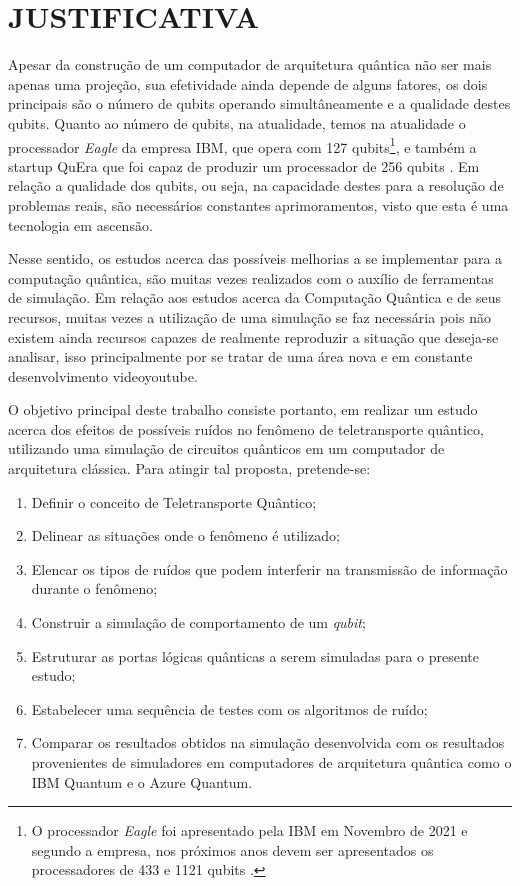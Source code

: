 \documentclass[12pt,oneside,brazil,hidelinks,article,sumario=tradicional,a4paper]{abntex2}
\begin{document}
\clearpage




\section{JUSTIFICATIVA}\label{sec:just}

Apesar da construção de um computador de arquitetura quântica não ser mais apenas uma projeção, sua efetividade ainda depende de alguns fatores, os dois principais são o número de qubits operando simultâneamente e a qualidade destes qubits.
Quanto ao número de qubits, na atualidade, temos na atualidade o processador \textit{Eagle} da empresa IBM, que opera com 127 qubits\footnote{O processador \textit{Eagle} foi apresentado pela IBM em Novembro de 2021 e segundo a empresa, nos próximos anos devem ser apresentados os processadores de 433 e 1121 qubits \cite{processadoribm}.}, e também a startup QuEra que foi capaz de produzir um processador de 256 qubits \cite{quera}. Em relação a qualidade dos qubits, ou seja, na capacidade destes para a resolução de problemas reais, são necessários constantes aprimoramentos, visto que esta é uma tecnologia em ascensão.

Nesse sentido, os estudos acerca das possíveis melhorias a se implementar para a computação quântica, são muitas vezes realizados com o auxílio de ferramentas de simulação. Em relação aos estudos acerca da Computação Quântica e de seus recursos, muitas vezes a utilização de uma simulação se faz necessária pois não existem ainda recursos capazes de realmente reproduzir a situação que deseja-se analisar, isso principalmente por se tratar de uma área nova e em constante desenvolvimento {videoyoutube}.

O objetivo principal deste trabalho consiste portanto, em realizar um estudo acerca dos efeitos de possíveis ruídos no fenômeno de teletransporte quântico, utilizando uma simulação de circuitos quânticos em um computador de arquitetura clássica. Para atingir tal proposta, pretende-se:
\begin{enumerate}
\item Definir o conceito de Teletransporte Quântico; \label{obj1}
\item Delinear as situações onde o fenômeno é utilizado; \label{obj2}
\item Elencar os tipos de ruídos que podem interferir na transmissão de informação durante o fenômeno;\label{obj3}
\item Construir a simulação de comportamento de um \textit{qubit};\label{obj4}
\item Estruturar as portas lógicas quânticas a serem simuladas para o presente estudo;\label{obj5}
\item Estabelecer uma sequência de testes com os algoritmos de ruído;\label{obj6}
\item Comparar os resultados obtidos na simulação desenvolvida com os resultados provenientes de simuladores em computadores de arquitetura quântica como o IBM Quantum e o Azure Quantum. \label{obj7}
\end{enumerate} 
\end{document}

